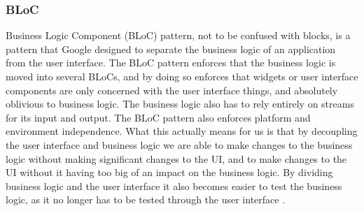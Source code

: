 \subsubsection{BLoC}
Business Logic Component (BLoC) pattern, not to be confused with blocks, is a pattern that Google designed to separate the business logic of an application from the user interface.
The BLoC pattern enforces that the business logic is moved into several BLoCs, and by doing so enforces that widgets or user interface components are only concerned with the user interface things, and absolutely oblivious to business logic. 
The business logic also has to rely entirely on streams for its input and output.
The BLoC pattern also enforces platform and environment independence. 
What this actually means for us is that by decoupling the user interface and business logic we are able to make changes to the business logic without making significant changes to the UI, and to make changes to the UI without it having too big of an impact on the business logic. 
By dividing business logic and the user interface it also becomes easier to test the business logic, as it no longer has to be tested through the user interface \cite{Flutterintro}.
